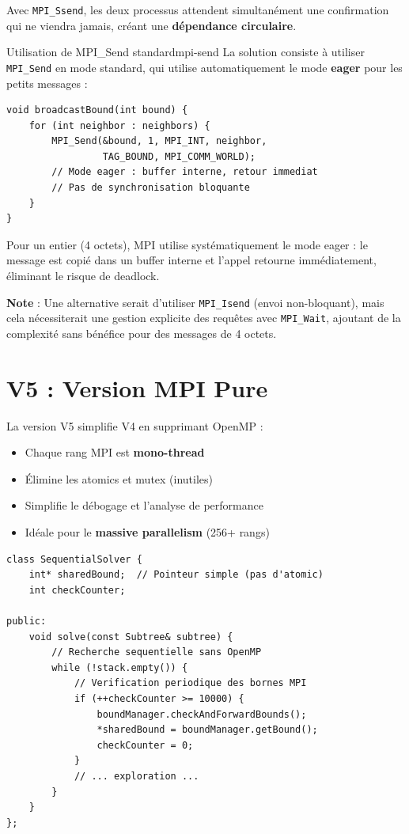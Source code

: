 \documentclass[12pt,a4paper,twoside]{report}
\begin{document}
Avec \texttt{MPI\_Ssend}, les deux processus attendent simultanément une confirmation qui ne viendra jamais, créant une \textbf{dépendance circulaire}.

\begin{solution}{Utilisation de MPI\_Send standard}{mpi-send}
La solution consiste à utiliser \texttt{MPI\_Send} en mode standard, qui utilise automatiquement le mode \textbf{eager} pour les petits messages :

\begin{lstlisting}
void broadcastBound(int bound) {
    for (int neighbor : neighbors) {
        MPI_Send(&bound, 1, MPI_INT, neighbor,
                 TAG_BOUND, MPI_COMM_WORLD);
        // Mode eager : buffer interne, retour immediat
        // Pas de synchronisation bloquante
    }
}
\end{lstlisting}

Pour un entier (4 octets), MPI utilise systématiquement le mode eager : le message est copié dans un buffer interne et l'appel retourne immédiatement, éliminant le risque de deadlock.

\textbf{Note} : Une alternative serait d'utiliser \texttt{MPI\_Isend} (envoi non-bloquant), mais cela nécessiterait une gestion explicite des requêtes avec \texttt{MPI\_Wait}, ajoutant de la complexité sans bénéfice pour des messages de 4 octets.
\end{solution}

\section{V5 : Version MPI Pure}

La version V5 simplifie V4 en supprimant OpenMP :

\begin{itemize}
    \item Chaque rang MPI est \textbf{mono-thread}
    \item Élimine les atomics et mutex (inutiles)
    \item Simplifie le débogage et l'analyse de performance
    \item Idéale pour le \textbf{massive parallelism} (256+ rangs)
\end{itemize}

\begin{lstlisting}[caption={Solveur séquentiel simplifié de V5}]
class SequentialSolver {
    int* sharedBound;  // Pointeur simple (pas d'atomic)
    int checkCounter;

public:
    void solve(const Subtree& subtree) {
        // Recherche sequentielle sans OpenMP
        while (!stack.empty()) {
            // Verification periodique des bornes MPI
            if (++checkCounter >= 10000) {
                boundManager.checkAndForwardBounds();
                *sharedBound = boundManager.getBound();
                checkCounter = 0;
            }
            // ... exploration ...
        }
    }
};
\end{lstlisting}
\end{document}
